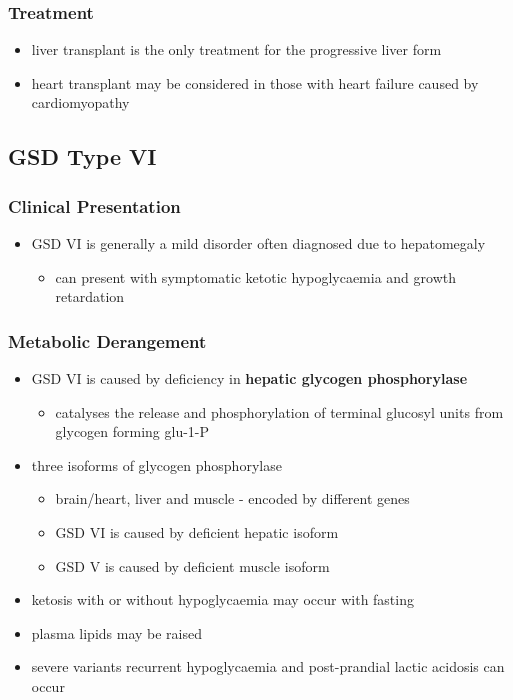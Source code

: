 \documentclass[12pt]{scrartcl}
\begin{document}
\subsubsection{Treatment}
\label{sec:org179c64c}
\begin{itemize}
\item liver transplant is the only treatment for the progressive liver form
\item heart transplant may be considered in those with heart failure caused by cardiomyopathy
\end{itemize}
\subsection{GSD Type VI}
\label{sec:orgacfef46}
\subsubsection{Clinical Presentation}
\label{sec:orgfe66681}
\begin{itemize}
\item GSD VI is generally a mild disorder often diagnosed due to hepatomegaly
\begin{itemize}
\item can present with symptomatic ketotic hypoglycaemia and growth retardation
\end{itemize}
\end{itemize}
\subsubsection{Metabolic Derangement}
\label{sec:orgf3400db}
\begin{itemize}
\item GSD VI is caused by deficiency in \textbf{hepatic glycogen phosphorylase}
\begin{itemize}
\item catalyses the release and phosphorylation of terminal glucosyl units
from glycogen forming glu-1-P
\end{itemize}
\item three isoforms of glycogen phosphorylase
\begin{itemize}
\item brain/heart, liver and muscle - encoded by different genes
\item GSD VI is caused by deficient hepatic isoform
\item GSD V is caused by deficient muscle isoform
\end{itemize}
\item ketosis with or without hypoglycaemia may occur with fasting
\item plasma lipids may be raised
\item severe variants recurrent hypoglycaemia and post-prandial lactic
acidosis can occur
\end{itemize}
\end{document}
